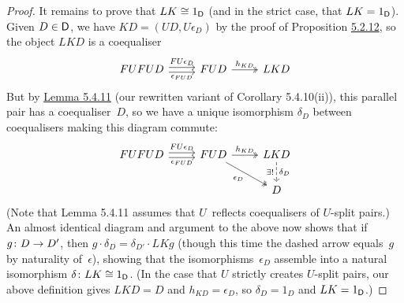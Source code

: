 \documentclass[../../solutions]{subfiles}
\begin{document}
\begin{proof}[Proof]
  It remains to prove that $LK\cong 1_{\mathsf{D}}$ (and in the strict case,
  that $LK=1_{\mathsf{D}}$).  Given $D\in{\mathsf{D}}$, we have $KD=(UD,U\epsilon_D)$
  by the proof of Proposition \hyperref[prop:5.2.12]{5.2.12}, so the
  object $LKD$ is a coequaliser
  $$
  \begin{tikzcd}
    FUFUD
    \ar[r, shift left=0.5ex, "FU\epsilon_D"]
    \ar[r, shift right=0.5ex, "\epsilon_{FUD}"']
    & FUD
    \ar[r, twoheadrightarrow, "h_{KD}"]
    & LKD
  \end{tikzcd}
  $$
  But by \hyperref[lemma:5.4.11]{Lemma 5.4.11} (our rewritten variant
  of Corollary 5.4.10(ii)), this parallel pair has a coequaliser~$D$,
  so we have a unique isomorphism $\delta_D$ between coequalisers
  making this diagram commute:
  $$
  \begin{tikzcd}
    FUFUD
    \ar[r, shift left=0.5ex, "FU\epsilon_D"]
    \ar[r, shift right=0.5ex, "\epsilon_{FUD}"']
    & FUD
    \ar[r, twoheadrightarrow, "h_{KD}"]
    \ar[rd, twoheadrightarrow, "\epsilon_D"']
    & LKD
    \ar[d, dashed, "\exists!"', "\delta_D"]
    \\
    && D
  \end{tikzcd}
  $$
  (Note that Lemma 5.4.11 assumes that $U$~reflects coequalisers of
  $U$-split pairs.)  An almost identical diagram and argument to the
  above now shows that if ${g}\colon{D}\to{D'}$, then
  $g\cdot \delta_D=\delta_{D'}\cdot LKg$ (though this time the dashed
  arrow equals~$g$ by naturality of~$\epsilon$), showing that the
  isomorphisms~$\epsilon_D$ assemble into a natural isomorphism
  $\delta\colon LK\cong 1_{\mathsf{D}}$.  (In the case that $U$ strictly
  creates $U$-split pairs, our above definition gives $LKD=D$ and
  $h_{KD}=\epsilon_D$, so $\delta_D=1_D$ and $LK=1_{\mathsf{D}}$.)
\end{proof}
\end{document}
